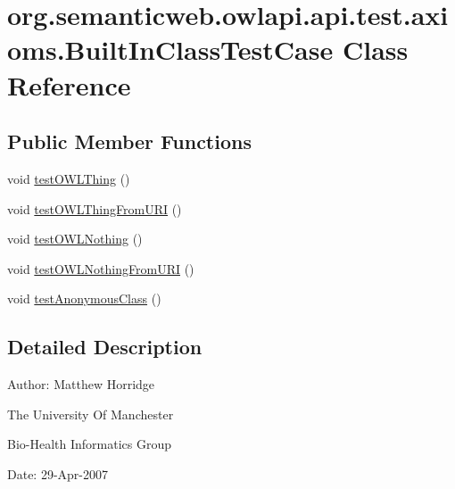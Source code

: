 \hypertarget{classorg_1_1semanticweb_1_1owlapi_1_1api_1_1test_1_1axioms_1_1_built_in_class_test_case}{\section{org.\-semanticweb.\-owlapi.\-api.\-test.\-axioms.\-Built\-In\-Class\-Test\-Case Class Reference}
\label{classorg_1_1semanticweb_1_1owlapi_1_1api_1_1test_1_1axioms_1_1_built_in_class_test_case}
}
\subsection*{Public Member Functions}
\begin{DoxyCompactItemize}
\item 
void \hyperlink{classorg_1_1semanticweb_1_1owlapi_1_1api_1_1test_1_1axioms_1_1_built_in_class_test_case_adad14391cf5968adf2fb5bf13314af41}{test\-O\-W\-L\-Thing} ()
\item 
void \hyperlink{classorg_1_1semanticweb_1_1owlapi_1_1api_1_1test_1_1axioms_1_1_built_in_class_test_case_ab4bcc38b9a2b96f0fc03306d4d48fe36}{test\-O\-W\-L\-Thing\-From\-U\-R\-I} ()
\item 
void \hyperlink{classorg_1_1semanticweb_1_1owlapi_1_1api_1_1test_1_1axioms_1_1_built_in_class_test_case_af379784f138181a6add6e4c175c1d95f}{test\-O\-W\-L\-Nothing} ()
\item 
void \hyperlink{classorg_1_1semanticweb_1_1owlapi_1_1api_1_1test_1_1axioms_1_1_built_in_class_test_case_a1f5a5a0fc4c59a82685e1e4156b29bc8}{test\-O\-W\-L\-Nothing\-From\-U\-R\-I} ()
\item 
void \hyperlink{classorg_1_1semanticweb_1_1owlapi_1_1api_1_1test_1_1axioms_1_1_built_in_class_test_case_addd5491a773e0a3432ebfb2211bc0a7b}{test\-Anonymous\-Class} ()
\end{DoxyCompactItemize}


\subsection{Detailed Description}
Author\-: Matthew Horridge\par
 The University Of Manchester\par
 Bio-\/\-Health Informatics Group\par
 Date\-: 29-\/\-Apr-\/2007\par
 \par
 

